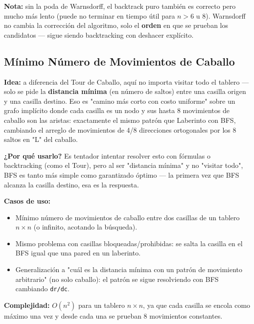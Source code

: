 \documentclass[10pt,a4paper,twocolumn]{article}
\begin{document}
\textbf{Nota:} sin la poda de Warnsdorff, el backtrack puro también
es correcto pero mucho más lento (puede no terminar en tiempo útil
para $n > 6$ u $8$). Warnsdorff no cambia la corrección del
algoritmo, solo el \textbf{orden} en que se prueban los candidatos —
sigue siendo backtracking con deshacer explícito.


\subsection{Mínimo Número de Movimientos de Caballo}

\textbf{Idea:} a diferencia del Tour de Caballo, aquí no importa
visitar todo el tablero — solo se pide la \textbf{distancia mínima}
(en número de saltos) entre una casilla origen y una casilla
destino. Eso es "camino más corto con costo uniforme" sobre un grafo
implícito donde cada casilla es un nodo y sus hasta 8 movimientos de
caballo son las aristas: exactamente el mismo patrón que
Laberinto con BFS, cambiando el arreglo de movimientos de 4/8
direcciones ortogonales por los 8 saltos en "L" del caballo.

\textbf{¿Por qué usarlo?} Es tentador intentar resolver esto con
fórmulas o backtracking (como el Tour), pero al ser "distancia
mínima" y no "visitar todo", BFS es tanto más simple como
garantizado óptimo — la primera vez que BFS alcanza la casilla
destino, esa es la respuesta.

\textbf{Casos de uso:}

\begin{itemize}
	\item Mínimo número de movimientos de caballo entre dos casillas
	de un tablero $n \times n$ (o infinito, acotando la búsqueda).
	\item Mismo problema con casillas bloqueadas/prohibidas: se
	salta la casilla en el BFS igual que una pared en un laberinto.
	\item Generalización a "cuál es la distancia mínima con un patrón
	de movimiento arbitrario" (no solo caballo): el patrón se sigue
	resolviendo con BFS cambiando \texttt{dr/dc}.
\end{itemize}

\textbf{Complejidad:} $O(n^2)$ para un tablero $n \times n$, ya que
cada casilla se encola como máximo una vez y desde cada una se
prueban 8 movimientos constantes.
\end{document}
